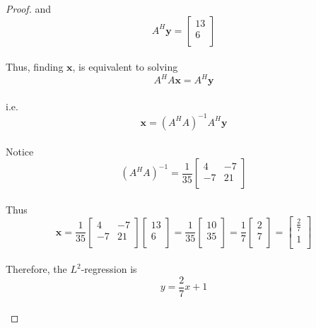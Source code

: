 \documentclass[12pt,oneside]{amsart}
\numberwithin{equation}{section}
\numberwithin{figure}{section}
\theoremstyle{plain}
\theoremstyle{definition}
\begin{document}
\begin{proof}
and \\
\[A^H\mathbf{y} = \begin{bmatrix}
  13 \\
  6  \\
\end{bmatrix}\] \\
Thus, finding $\mathbf{x}$, is equivalent to solving \\
\[A^HA\mathbf{x} = A^H\mathbf{y}\] \\
i.e. \\
\[\mathbf{x} = (A^HA)^{-1}A^H\mathbf{y}\] \\
Notice \\
\[(A^HA)^{-1} = \frac{1}{35}\begin{bmatrix}
  4  & -7 \\
  -7 & 21 \\
\end{bmatrix}\] \\
Thus \\
\[\mathbf{x} = \frac{1}{35}\begin{bmatrix}
  4  & -7 \\
  -7 & 21 \\
\end{bmatrix}\begin{bmatrix}
  13 \\
  6  \\
\end{bmatrix} = \frac{1}{35}\begin{bmatrix}
  10 \\
  35 \\
\end{bmatrix} = \frac{1}{7}\begin{bmatrix}
  2 \\
  7 \\
\end{bmatrix} = \begin{bmatrix}
  \frac{2}{7} \\
  1 \\
\end{bmatrix}\] \\
Therefore, the $L^2$-regression is \\
\[y = \frac{2}{7}x + 1\] \\
\end{proof}
\end{document}

